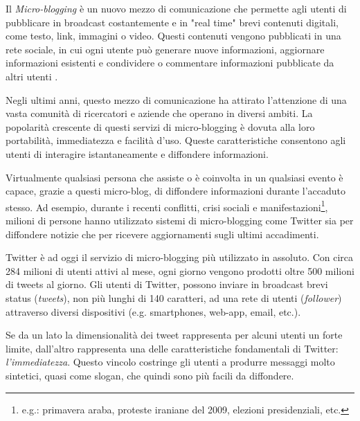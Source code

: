 



Il \emph{Micro-blogging} è un nuovo mezzo di comunicazione che permette agli utenti di pubblicare in broadcast  costantemente e in  "real time" brevi contenuti digitali, come testo, link, immagini o video. 
Questi contenuti vengono pubblicati in una rete sociale, in cui ogni utente può generare nuove informazioni, aggiornare informazioni esistenti e condividere o commentare informazioni pubblicate da altri utenti \cite{Java:2007:WWT:1348549.1348556}.  

Negli ultimi anni, questo mezzo di comunicazione ha attirato l'attenzione di una vasta  comunità  di ricercatori e aziende che operano in diversi ambiti.
La popolarità crescente di questi servizi di micro-blogging è dovuta alla loro portabilità, immediatezza e facilità d'uso. Queste caratteristiche consentono agli utenti di interagire istantaneamente e diffondere informazioni.

Virtualmente qualsiasi persona che assiste o è coinvolta in un qualsiasi evento è capace, grazie a questi micro-blog, di diffondere informazioni durante l'accaduto stesso. Ad esempio, durante i recenti conflitti, crisi sociali e manifestazioni\footnote{e.g.: primavera araba, proteste iraniane del 2009, elezioni presidenziali, etc.}, milioni di persone hanno utilizzato sistemi di micro-blogging come Twitter sia per diffondere notizie che per ricevere aggiornamenti sugli ultimi accadimenti.

Twitter è ad oggi il servizio di micro-blogging più utilizzato in assoluto. Con circa 284 milioni di utenti attivi al mese, ogni giorno vengono prodotti oltre 500 milioni di tweets al giorno. Gli utenti di Twitter, possono inviare in broadcast brevi status (\emph{tweets}), non  più lunghi di 140 caratteri,
 ad una rete di utenti (\emph{follower}) attraverso diversi dispositivi (e.g. smartphones, web-app, email, etc.).
 
Se da un lato la dimensionalità dei tweet rappresenta per alcuni utenti un forte limite, dall'altro rappresenta una delle caratteristiche fondamentali di Twitter: \emph{l'immediatezza}. Questo vincolo costringe gli utenti a produrre messaggi molto sintetici, quasi come slogan, che quindi sono più facili da diffondere.

